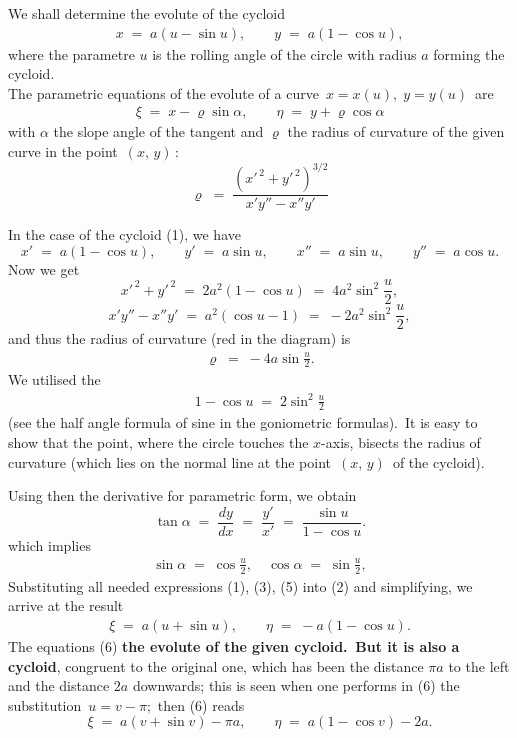 \documentclass[12pt]{article}
\begin{document}

We shall determine the evolute of the cycloid
\begin{align}
x \;=\; a(u-\sin{u}), \qquad y \;=\; a(1-\cos{u}),
\end{align}
where the parametre $u$ is the rolling angle of the circle with radius $a$ forming the cycloid.\\

The parametric equations of the evolute of a curve\, $x = x(u),\; y = y(u)$\, are
\begin{align}
\xi \;=\; x-\varrho\sin{\alpha}, \qquad \eta \;=\; y+\varrho\cos{\alpha}
\end{align}
with $\alpha$ the slope angle of the tangent and $\varrho$ the radius of curvature of the given curve in the point \,$(x,\,y)$\,:
$$\varrho \;=\; \frac{(x'^{\,2}+y'^{\,2})^{3/2}}{x'y''-x''y'}$$

In the case of the cycloid (1), we have
$$x' \;=\; a(1-\cos{u}), \qquad y' \;=\; a\sin{u}, \qquad x'' \;=\; a\sin{u}, \qquad y'' \;=\; a\cos{u}.$$
Now we get
$$x'^{\,2}+y'^{\,2} \;=\; 2a^2(1-\cos{u}) \;=\; 4a^2\sin^2\frac{u}{2},$$
$$x'y''-x''y' \;=\; a^2(\cos{u}-1) \;=\; -2a^2\sin^2\frac{u}{2},$$
and thus the radius of curvature (red in the diagram) is
\begin{align}
\varrho \;=\; -4a\sin\frac{u}{2}.
\end{align}
We utilised the 
\begin{align}
1-\cos{u} \;=\; 2\sin^2\frac{u}{2}
\end{align}
(see the half angle formula of sine in the goniometric formulas).\, It is easy to show that the point, where the circle touches the $x$-axis, bisects the radius of curvature (which lies on the normal line at the point\, $(x,\,y)$\, of the cycloid).

Using then the derivative for parametric form, we obtain
$$\tan\alpha \;=\; \frac{dy}{dx} \;=\; \frac{y'}{x'} \;=\; \frac{\sin{u}}{1-\cos{u}}.$$
which implies
\begin{align}
\sin\alpha \;=\; \cos\frac{u}{2}, \quad \cos\alpha \;=\; \sin\frac{u}{2},
\end{align}
Substituting all needed expressions (1), (3), (5) into (2) and simplifying, we arrive at the result
\begin{align}
\xi \;=\; a(u+\sin{u}), \qquad \eta \;=\; -a(1-\cos{u}).
\end{align}
The equations (6)  \textbf{the evolute of the given cycloid.\, But it is also a cycloid}, congruent to the original one, which has been  the distance $\pi a$ to the left and the distance $2a$ downwards; this is seen when one performs in (6) the substitution \,$u = v-\pi$;\, then (6) reads
$$\xi \;=\; a(v+\sin{v})-\pi a, \qquad \eta \;=\; a(1-\cos{v})-2a.$$\\
\end{document}
